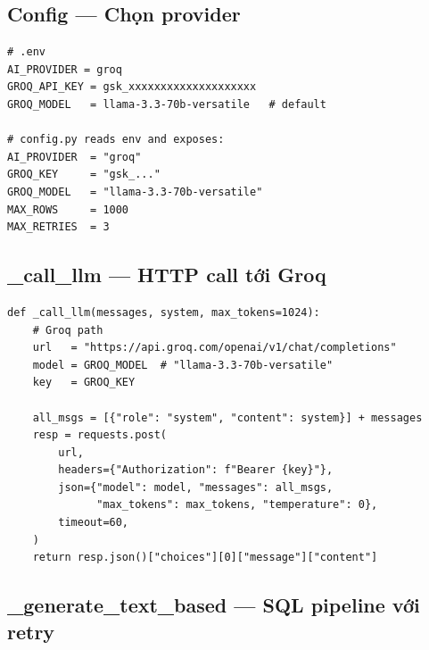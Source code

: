 \documentclass[12pt, a4paper]{article}
\begin{document}
\subsection{Config — Chọn provider}

\begin{codebox}[title={bi/config.py — Groq settings}]
\begin{verbatim}
# .env
AI_PROVIDER = groq
GROQ_API_KEY = gsk_xxxxxxxxxxxxxxxxxxxx
GROQ_MODEL   = llama-3.3-70b-versatile   # default

# config.py reads env and exposes:
AI_PROVIDER  = "groq"
GROQ_KEY     = "gsk_..."
GROQ_MODEL   = "llama-3.3-70b-versatile"
MAX_ROWS     = 1000
MAX_RETRIES  = 3
\end{verbatim}
\end{codebox}

\subsection{\_call\_llm — HTTP call tới Groq}

\begin{codebox}[title={bi/agent.py — Groq API call (OpenAI-compatible endpoint)}]
\begin{verbatim}
def _call_llm(messages, system, max_tokens=1024):
    # Groq path
    url   = "https://api.groq.com/openai/v1/chat/completions"
    model = GROQ_MODEL  # "llama-3.3-70b-versatile"
    key   = GROQ_KEY

    all_msgs = [{"role": "system", "content": system}] + messages
    resp = requests.post(
        url,
        headers={"Authorization": f"Bearer {key}"},
        json={"model": model, "messages": all_msgs,
              "max_tokens": max_tokens, "temperature": 0},
        timeout=60,
    )
    return resp.json()["choices"][0]["message"]["content"]
\end{verbatim}
\end{codebox}

\subsection{\_generate\_text\_based — SQL pipeline với retry}
\end{document}
